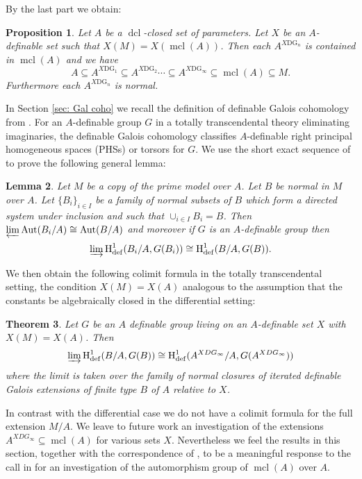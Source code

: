 \documentclass{amsart}
\newtheorem{theorem}{Theorem}[section]
\newtheorem{proposition}[theorem]{Proposition}
\newtheorem{lemma}[theorem]{Lemma}
\theoremstyle{definition}
\theoremstyle{remark}
\numberwithin{equation}{section}
\def \defin {\operatorname{def}}
\def \HH {\operatorname{H}}
\def \aut {\text{Aut}}
\def \mcl {\operatorname{mcl}}
\def \dcl {\operatorname{dcl}}
\begin{document}
By the last part we obtain:

\begin{proposition}
    Let $A$ be a $\dcl$-closed set of parameters. Let $X$ be an $A$-definable set such that $X(M) = X(\mcl(A))$. Then each $A^{X\text{DG}_n}$ is contained in $\mcl(A)$ and we have $$A \subseteq A^{X\text{DG}_1} \subseteq A^{X\text{DG}_2} \cdots \subseteq A^{X\text{DG}_\infty} \subseteq \mcl(A) \subseteq M.$$ Furthermore each $A^{X\text{DG}_n}$ is normal.
\end{proposition}

In Section \ref{sec: Gal coho} we recall the definition of definable Galois cohomology from \cite{pillay1997}. For an $A$-definable group $G$ in a totally transcendental theory eliminating imaginaries, the definable Galois cohomology classifies
$A$-definable right principal homogeneous spaces (PHSs) or torsors for $G$. We use the short exact sequence of \cite{MERETZKY_SES} to prove the following general lemma: 

\begin{lemma}
    Let $M$ be a copy of the prime model over $A$. Let $B$ be normal in $M$ over $A$. Let $\{B_i\}_{i \in I}$ be a family of normal subsets of $B$ which form a directed system under inclusion and such that $\cup_{i \in I}B_i = B$. Then $\varprojlim \aut(B_i/A) \cong \aut(B/A)$ and moreover if $G$ is an $A$-definable group then $$\varinjlim \HH^1_{\defin}(B_i/A,G(B_i)) \cong \HH^1_{\defin}(B/A,G(B)).$$
\end{lemma}

We then obtain the following colimit formula in the totally transcendental setting, the condition $X(M)=X(A)$ analogous to the assumption that the constants be algebraically closed in the differential setting:

\begin{theorem}\label{thm: idg colim}
    Let $G$ be an $A$ definable group living on an $A$-definable set $X$ with $X(M)=X(A)$. Then $$\varinjlim \HH^{1}_{\defin}(B/A, G(B)) \cong \HH^{1}_{\defin}(A^{XDG_\infty}/A, G(A^{XDG_\infty}))$$ where the limit is taken over the family of normal closures of iterated definable Galois extensions of finite type $B$ of $A$ relative to $X$.
\end{theorem}

In contrast with the differential case we do not have a colimit formula for the full extension $M/A$. We leave to future work an investigation of the extensions $A^{XDG_\infty} \subseteq \mcl(A)$ for various sets $X$. Nevertheless we feel the results in this section, together with the correspondence of \cite{meretzky2026galoistheoryautomorphismgroups}, to be a meaningful response to the call in \cite{PoizatPrime} for an investigation of the automorphism group of $\mcl(A)$ over $A$. 
\end{document}
